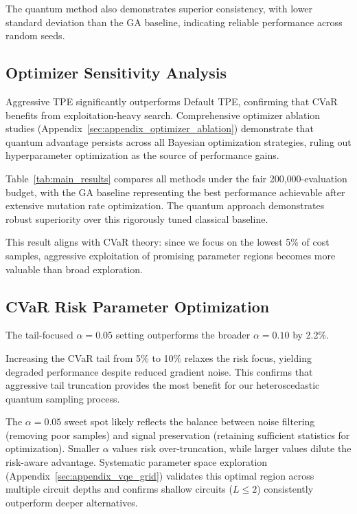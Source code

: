 The quantum method also demonstrates superior consistency, with lower 
standard deviation than the GA baseline, indicating reliable 
performance across random seeds.

\subsection{Optimizer Sensitivity Analysis}

Aggressive TPE significantly outperforms Default TPE, confirming that CVaR 
benefits from exploitation-heavy search. Comprehensive optimizer ablation studies 
(Appendix~\ref{sec:appendix_optimizer_ablation}) demonstrate that quantum advantage 
persists across all Bayesian optimization strategies, ruling out hyperparameter 
optimization as the source of performance gains.

Table~\ref{tab:main_results} compares all methods under the fair 
200{,}000-evaluation budget, with the GA baseline representing the best performance 
achievable after extensive mutation rate optimization. The quantum approach demonstrates robust 
superiority over this rigorously tuned classical baseline.



This result aligns with CVaR theory: since we focus on the lowest 5\% of cost 
samples, aggressive exploitation of promising parameter regions becomes more 
valuable than broad exploration.

\subsection{CVaR Risk Parameter Optimization}

The tail-focused $\alpha=0.05$ setting outperforms the broader $\alpha=0.10$ 
by 2.2\%.

Increasing the CVaR tail from 5\% to 10\% relaxes the risk focus, 
yielding degraded performance despite reduced gradient noise. This confirms that aggressive tail truncation provides the 
most benefit for our heteroscedastic quantum sampling process.

The $\alpha=0.05$ sweet spot likely reflects the balance between noise filtering 
(removing poor samples) and signal preservation (retaining sufficient statistics 
for optimization). Smaller $\alpha$ values risk over-truncation, while larger 
values dilute the risk-aware advantage. Systematic parameter space exploration 
(Appendix~\ref{sec:appendix_vqe_grid}) validates this optimal region across 
multiple circuit depths and confirms shallow circuits ($L \leq 2$) consistently 
outperform deeper alternatives.

